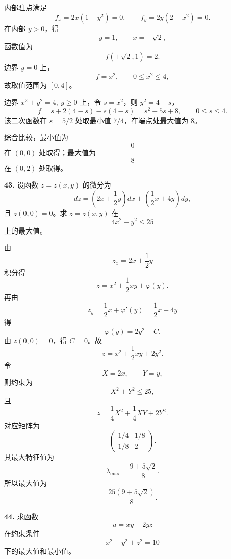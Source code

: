 \begin{solutionblock}
内部驻点满足
\[
f_x=2x(1-y^2)=0,\qquad
f_y=2y(2-x^2)=0.
\]
在内部 \(y>0\)，得
\[
y=1,\qquad x=\pm\sqrt2,
\]
函数值为
\[
f(\pm\sqrt2,1)=2.
\]
边界 \(y=0\) 上，
\[
f=x^2,\qquad 0\le x^2\le4,
\]
故取值范围为 \([0,4]\)。

边界 \(x^2+y^2=4,\ y\ge0\) 上，令 \(s=x^2\)，则 \(y^2=4-s\)，
\[
f=s+2(4-s)-s(4-s)=s^2-5s+8,\qquad 0\le s\le4.
\]
该二次函数在 \(s=5/2\) 处取最小值 \(7/4\)，在端点处最大值为 \(8\)。

综合比较，最小值为
\[
\boxed{0}
\]
在 \((0,0)\) 处取得；最大值为
\[
\boxed{8}
\]
在 \((0,2)\) 处取得。
\end{solutionblock}

\begin{problemblock}
\textbf{43.} 设函数 \(z=z(x,y)\) 的微分为
\[
dz=\left(2x+\frac12y\right)dx+\left(\frac12x+4y\right)dy,
\]
且 \(z(0,0)=0\)。求 \(z=z(x,y)\) 在
\[
4x^2+y^2\le25
\]
上的最大值。
\end{problemblock}

\begin{solutionblock}
由
\[
z_x=2x+\frac12y
\]
积分得
\[
z=x^2+\frac12xy+\varphi(y).
\]
再由
\[
z_y=\frac12x+\varphi'(y)=\frac12x+4y
\]
得
\[
\varphi(y)=2y^2+C.
\]
由 \(z(0,0)=0\)，得 \(C=0\)。故
\[
z=x^2+\frac12xy+2y^2.
\]
令
\[
X=2x,\qquad Y=y,
\]
则约束为
\[
X^2+Y^2\le25,
\]
且
\[
z=\frac14X^2+\frac14XY+2Y^2.
\]
对应矩阵为
\[
\begin{pmatrix}
1/4&1/8\\
1/8&2
\end{pmatrix}.
\]
其最大特征值为
\[
\lambda_{\max}=\frac{9+5\sqrt2}{8}.
\]
所以最大值为
\[
\boxed{\frac{25(9+5\sqrt2)}{8}}.
\]
\end{solutionblock}

\begin{problemblock}
\textbf{44.} 求函数
\[
u=xy+2yz
\]
在约束条件
\[
x^2+y^2+z^2=10
\]
下的最大值和最小值。
\end{problemblock}


